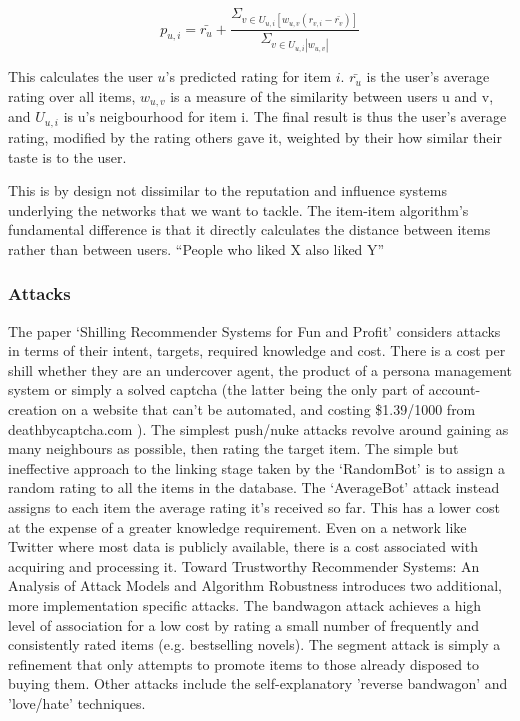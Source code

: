 \begin{equation*}
p_{u, i} = \bar{r_u} + \frac{\Sigma_{v \in U_{u, i} [w_{u, v}(r_{v, i} - \bar{r_v})]}}{\Sigma_{v\in U_{u, i} \left| w_{u, v} \right |}}
\end{equation*}

This calculates the user $u$'s predicted rating for item $i$. $\bar{r_u}$ is the user's average rating over all items, $w_{u, v}$ is a measure of the similarity between users u and v, and $U_{u, i}$ is u's neigbourhood for item i. The final result is thus the user's average rating, modified by the rating others gave it, weighted by their how similar their taste is to the user.

This is by design not dissimilar to the reputation and influence systems
underlying the networks that we want to tackle. The item-item algorithm's
fundamental difference is that it directly calculates the distance between items
rather than between users. ``People who liked X also liked Y''

\subsubsection{Attacks}

The paper `Shilling Recommender Systems for Fun and Profit'\cite{funProfit} considers attacks in terms of their intent, targets, required knowledge and cost. There is a cost per shill whether they are an undercover agent, the product of a persona management system or simply a solved captcha (the latter being the only part of account-creation on a website that can't be automated, and costing \$1.39/1000 from deathbycaptcha.com ). The simplest push/nuke attacks revolve around gaining as many neighbours as possible, then rating the target item. The simple but ineffective approach to the linking stage taken by the `RandomBot' is to assign a random rating to all the items in the database. The `AverageBot' attack instead assigns to each item the average rating it's received so far. This has a lower cost at the expense of a greater knowledge requirement. Even on a network like Twitter where most data is publicly available, there is a cost associated with acquiring and processing it. Toward Trustworthy Recommender Systems: An Analysis of Attack Models and Algorithm Robustness\cite{laterAttack} introduces two additional, more implementation specific attacks. The bandwagon attack achieves a high level of association for a low cost by rating a small number of frequently and consistently rated items (e.g. bestselling novels).  The segment attack is simply a refinement that only attempts to promote items to those already disposed to buying them. Other attacks include the self-explanatory 'reverse bandwagon' and 'love/hate' techniques.

